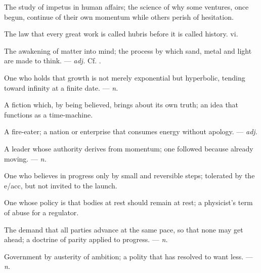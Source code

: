  The study of impetus in human affairs; the science of why some ventures, once begun, continue of their own momentum while others perish of hesitation.

 The law that every great work is called hubris before it is called history.   vi.

 The awakening of matter into mind; the process by which sand, metal and light are made to think. ---  \textit{adj.} Cf. .

 One who holds that growth is not merely exponential but hyperbolic, tending toward infinity at a finite date. ---  \textit{n.}

 A fiction which, by being believed, brings about its own truth; an idea that functions as a time-machine.

 A fire-eater; a nation or enterprise that consumes energy without apology. ---  \textit{adj.}

 A leader whose authority derives from momentum; one followed because already moving. ---  \textit{n.}

 One who believes in progress only by small and reversible steps; tolerated by the e/acc, but not invited to the launch.

 One whose policy is that bodies at rest should remain at rest; a physicist's term of abuse for a regulator.

 The demand that all parties advance at the same pace, so that none may get ahead; a doctrine of parity applied to progress. ---  \textit{n.}

 Government by austerity of ambition; a polity that has resolved to want less. ---  \textit{n.}

